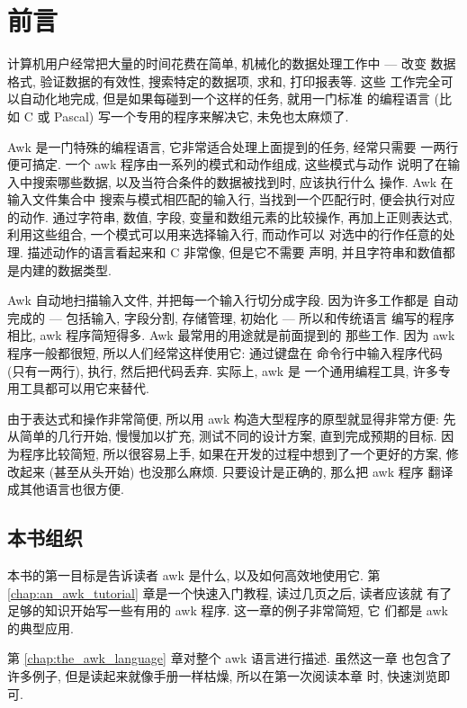 \chapter{前言}
\label{chap:preface}

计算机用户经常把大量的时间花费在简单, 机械化的数据处理工作中 --- 改变
数据格式, 验证数据的有效性, 搜索特定的数据项, 求和, 打印报表等. 这些
工作完全可以自动化地完成, 但是如果每碰到一个这样的任务, 就用一门标准
的编程语言 (比如 C 或 Pascal) 写一个专用的程序来解决它, 未免也太麻烦了.

Awk 是一门特殊的编程语言, 它非常适合处理上面提到的任务, 经常只需要
一两行便可搞定. 一个 awk 程序由一系列的模式和动作组成, 这些模式与动作
说明了在输入中搜索哪些数据, 以及当符合条件的数据被找到时, 应该执行什么
操作. Awk 在输入文件集合中 搜索与模式相匹配的输入行, 当找到一个匹配行时,
便会执行对应的动作. 通过字符串, 数值, 字段, 变量和数组元素的比较操作,
再加上正则表达式, 利用这些组合, 一个模式可以用来选择输入行, 而动作可以
对选中的行作任意的处理. 描述动作的语言看起来和 C 非常像, 但是它不需要
声明, 并且字符串和数值都是内建的数据类型.

Awk 自动地扫描输入文件, 并把每一个输入行切分成字段. 因为许多工作都是
自动完成的 --- 包括输入, 字段分割, 存储管理, 初始化 --- 所以和传统语言
编写的程序相比, awk 程序简短得多. Awk 最常用的用途就是前面提到的
那些工作. 因为 awk 程序一般都很短, 所以人们经常这样使用它: 通过键盘在
命令行中输入程序代码 (只有一两行), 执行, 然后把代码丢弃. 实际上, awk 是
一个通用编程工具, 许多专用工具都可以用它来替代.

由于表达式和操作非常简便, 所以用 awk 构造大型程序的原型就显得非常方便:
先从简单的几行开始, 慢慢加以扩充, 测试不同的设计方案, 直到完成预期的目标.
因为程序比较简短, 所以很容易上手, 如果在开发的过程中想到了一个更好的方案,
修改起来 (甚至从头开始) 也没那么麻烦. 只要设计是正确的, 那么把 awk 程序
翻译成其他语言也很方便.

\section*{本书组织}
本书的第一目标是告诉读者 awk 是什么, 以及如何高效地使用它. 第 
\ref{chap:an_awk_tutorial} 章是一个快速入门教程, 读过几页之后, 读者应该就
有了足够的知识开始写一些有用的 awk 程序. 这一章的例子非常简短, 它
们都是 awk 的典型应用.

第 \ref{chap:the_awk_language} 章对整个 awk 语言进行描述. 虽然这一章
也包含了许多例子, 但是读起来就像手册一样枯燥, 所以在第一次阅读本章
时, 快速浏览即可.

